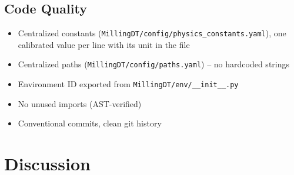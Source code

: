 \documentclass[11pt,a4paper]{article}
\begin{document}
\subsection{Code Quality}
\begin{itemize}
    \item Centralized constants (\texttt{MillingDT/\allowbreak config/\allowbreak physics\_constants.yaml}), one calibrated value per line with its unit in the file
    \item Centralized paths (\texttt{MillingDT/\allowbreak config/\allowbreak paths.yaml}) -- no hardcoded strings
    \item Environment ID exported from \texttt{MillingDT/env/\_\_init\_\_.py}
    \item No unused imports (AST-verified)
    \item Conventional commits, clean git history
\end{itemize}

\section{Discussion}
\end{document}
